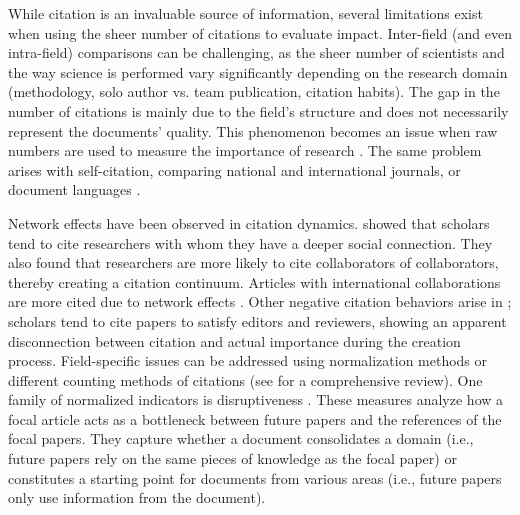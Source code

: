 While citation is an invaluable source of information, several limitations exist when using the sheer number of citations to evaluate impact. Inter-field (and even intra-field) comparisons can be challenging, as the sheer number of scientists and the way science is performed vary significantly depending on the research domain (methodology, solo author vs. team publication, citation habits). The gap in the number of citations is mainly due to the field's structure and does not necessarily represent the documents' quality. This phenomenon becomes an issue when raw numbers are used to measure the importance of research \citep{purkayastha2019comparison}. The same problem arises with self-citation, comparing national and international journals, or document languages \citep{van2001language}.

Network effects have been observed in citation dynamics. \cite{wallace2012small} showed that scholars tend to cite researchers with whom they have a deeper social connection. They also found that researchers are more likely to cite collaborators of collaborators, thereby creating a citation continuum. Articles with international collaborations are more cited due to network effects \citep{wagner2019international}. Other negative citation behaviors arise in \cite{bornmann2008citation}; scholars tend to cite papers to satisfy editors and reviewers, showing an apparent disconnection between citation and actual importance during the creation process. Field-specific issues can be addressed using normalization methods or different counting methods of citations (see \cite{waltman2016review} for a comprehensive review).
One family of normalized indicators is disruptiveness \citep{wu2019large,wu2019solo,wu_wu_2019,bu2019multi,bornmann1911disruption}. These measures analyze how a focal article acts as a bottleneck between future papers and the references of the focal papers. They capture whether a document consolidates a domain (i.e., future papers rely on the same pieces of knowledge as the focal paper) or constitutes a starting point for documents from various areas (i.e., future papers only use information from the document).

